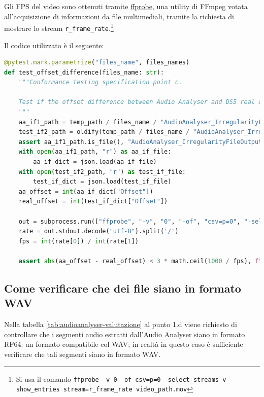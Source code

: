 Gli FPS del video sono ottenuti tramite \href{https://ffmpeg.org/ffprobe.html}{ffprobe}, una utility di FFmpeg votata all'acquisizione di informazioni da file multimediali, tramite la richiesta di mostrare lo stream \verb|r_frame_rate|.\footnote{Si usa il comando \texttt{ffprobe -v 0 -of csv=p=0 -select\_streams v -show\_entries stream=r\_frame\_rate video\_path.mov}}

Il codice utilizzato è il seguente:
\begin{lstlisting}[language=Python, caption={Codice del test di conformità sulla differenza tra scostamento reale e calcolato, Audio Analyser}]
@pytest.mark.parametrize("files_name", files_names)
def test_offset_difference(files_name: str):
    """Conformance testing specification point c.

    Test if the offset difference between Audio Analyser and DS5 real offset is small.
    """
    aa_if1_path = temp_path / files_name / "AudioAnalyser_IrregularityFileOutput1.json"
    test_if2_path = oldify(temp_path / files_name / "AudioAnalyser_IrregularityFileOutput1.json")
    assert aa_if1_path.is_file(), "AudioAnalyser_IrregularityFileOutput1.json not found"
    with open(aa_if1_path, "r") as aa_if_file:
        aa_if_dict = json.load(aa_if_file)
    with open(test_if2_path, "r") as test_if_file:
        test_if_dict = json.load(test_if_file)
    aa_offset = int(aa_if_dict["Offset"])
    real_offset = int(test_if_dict["Offset"])

    out = subprocess.run(["ffprobe", "-v", "0", "-of", "csv=p=0", "-select_streams", "v", "-show_entries", "stream=r_frame_rate", str(working_path / "PreservationAudioVisualFile" / (files_name+".mov"))], capture_output=True)
    rate = out.stdout.decode("utf-8").split('/')
    fps = int(rate[0]) / int(rate[1])
    
    assert abs(aa_offset - real_offset) < 3 * math.ceil(1000 / fps), f"Offset difference is too big: {abs(aa_offset - real_offset)}ms"
\end{lstlisting}


\subsection{Come verificare che dei file siano in formato WAV} \label{ssec:audioanalyser-wav}    %
Nella tabella \ref{tab:audioanalyser-valutazione} al punto 1.d viene richiesto di controllare che i segmenti audio estratti dall'Audio Analyser siano in formato RF64: un formato compatibile col WAV; in realtà in questo caso è sufficiente verificare che tali segmenti siano in formato WAV.

